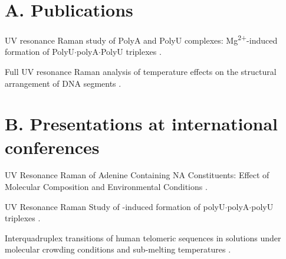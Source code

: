 
\section*{A. Publications}

\noindent
\begin{docenum}
\item UV resonance Raman study of PolyA and PolyU complexes:
	Mg\textsuperscript{2+}-induced formation of PolyU$\cdot$polyA$\cdot$PolyU
	triplexes \parencite{Klener2015}.
\item Full UV resonance Raman analysis of temperature effects on the structural
	arrangement of DNA segments \parencite{Klener2021}.
\end{docenum}

\par


\section*{B. Presentations at international conferences}

\begin{docenum}
\item UV Resonance Raman of Adenine Containing NA Constituents: Effect of
	Molecular Composition and Environmental Conditions
	\parencite{Klener2013}.
\item UV Resonance Raman Study of -induced formation of
	polyU$\cdot$polyA$\cdot$\allowbreak{}polyU triplexes
	\parencite{Klener2014}.
\item Interquadruplex transitions of human telomeric sequences in 
	solutions under molecular crowding conditions and sub-melting temperatures
	\parencite{Lindnerova-Mudronova2016}.
\end{docenum}
